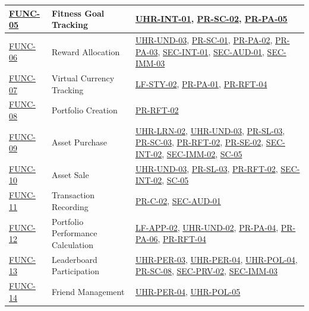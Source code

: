 \documentclass[12pt]{article}
\begin{document}
\begin{xltabular}{\textwidth}{|p{2.3cm}|p{4.2cm}|X|}
\hline
\hyperlink{req:FUNC-05}{FUNC-05} & Fitness Goal Tracking & \hyperlink{req:UHR-INT-01}{UHR-INT-01}, \hyperlink{req:PR-SC-02}{PR-SC-02}, \hyperlink{req:PR-PA-05}{PR-PA-05} \\
\hline
\hyperlink{req:FUNC-06}{FUNC-06} & Reward Allocation & \hyperlink{req:UHR-UND-03}{UHR-UND-03}, \hyperlink{req:PR-SC-01}{PR-SC-01}, \hyperlink{req:PR-PA-02}{PR-PA-02}, \hyperlink{req:PR-PA-03}{PR-PA-03}, \hyperlink{req:SEC-INT-01}{SEC-INT-01}, \hyperlink{req:SEC-AUD-01}{SEC-AUD-01}, \hyperlink{req:SEC-IMM-03}{SEC-IMM-03} \\
\hline
\hyperlink{req:FUNC-07}{FUNC-07} & Virtual Currency Tracking & \hyperlink{req:LF-STY-02}{LF-STY-02}, \hyperlink{req:PR-PA-01}{PR-PA-01}, \hyperlink{req:PR-RFT-04}{PR-RFT-04} \\
\hline
\hyperlink{req:FUNC-08}{FUNC-08} & Portfolio Creation & \hyperlink{req:PR-RFT-02}{PR-RFT-02} \\
\hline
\hyperlink{req:FUNC-09}{FUNC-09} & Asset Purchase & \hyperlink{req:UHR-LRN-02}{UHR-LRN-02}, \hyperlink{req:UHR-UND-03}{UHR-UND-03}, \hyperlink{req:PR-SL-03}{PR-SL-03}, \hyperlink{req:PR-SC-03}{PR-SC-03}, \hyperlink{req:PR-RFT-02}{PR-RFT-02}, \hyperlink{req:PR-SE-02}{PR-SE-02}, \hyperlink{req:SEC-INT-02}{SEC-INT-02}, \hyperlink{req:SEC-IMM-02}{SEC-IMM-02}, \hyperlink{req:SC-05}{SC-05} \\
\hline
\hyperlink{req:FUNC-10}{FUNC-10} & Asset Sale & \hyperlink{req:UHR-UND-03}{UHR-UND-03}, \hyperlink{req:PR-SL-03}{PR-SL-03}, \hyperlink{req:PR-RFT-02}{PR-RFT-02}, \hyperlink{req:SEC-INT-02}{SEC-INT-02}, \hyperlink{req:SC-05}{SC-05} \\
\hline
\hyperlink{req:FUNC-11}{FUNC-11} & Transaction Recording & \hyperlink{req:PR-C-02}{PR-C-02}, \hyperlink{req:SEC-AUD-01}{SEC-AUD-01} \\
\hline
\hyperlink{req:FUNC-12}{FUNC-12} & Portfolio Performance Calculation & \hyperlink{req:LF-APP-02}{LF-APP-02}, \hyperlink{req:UHR-UND-02}{UHR-UND-02}, \hyperlink{req:PR-PA-04}{PR-PA-04}, \hyperlink{req:PR-PA-06}{PR-PA-06}, \hyperlink{req:PR-RFT-04}{PR-RFT-04} \\
\hline
\hyperlink{req:FUNC-13}{FUNC-13} & Leaderboard Participation & \hyperlink{req:UHR-PER-03}{UHR-PER-03}, \hyperlink{req:UHR-PER-04}{UHR-PER-04}, \hyperlink{req:UHR-POL-04}{UHR-POL-04}, \hyperlink{req:PR-SC-08}{PR-SC-08}, \hyperlink{req:SEC-PRV-02}{SEC-PRV-02}, \hyperlink{req:SEC-IMM-03}{SEC-IMM-03} \\
\hline
\hyperlink{req:FUNC-14}{FUNC-14} & Friend Management & \hyperlink{req:UHR-PER-04}{UHR-PER-04}, \hyperlink{req:UHR-POL-05}{UHR-POL-05} \\

\end{xltabular}
\end{document}
